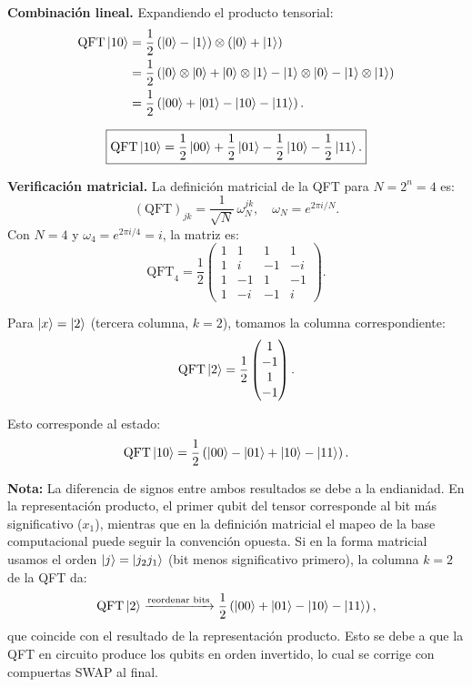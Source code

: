 \begin{enumerate}[a)]
	      \textbf{Combinación lineal.} Expandiendo el producto tensorial:
	      \begin{align*}
		      \text{QFT}\ket{10} & = \frac{1}{2}\left(\ket{0} - \ket{1}\right) \otimes \left(\ket{0} + \ket{1}\right)                                      \\
		                         & = \frac{1}{2}\left(\ket{0}\otimes\ket{0} + \ket{0}\otimes\ket{1} - \ket{1}\otimes\ket{0} - \ket{1}\otimes\ket{1}\right) \\
		                         & = \frac{1}{2}\left(\ket{00} + \ket{01} - \ket{10} - \ket{11}\right).
	      \end{align*}

	      \[
		      \boxed{\text{QFT}\ket{10} = \frac{1}{2}\ket{00} + \frac{1}{2}\ket{01} - \frac{1}{2}\ket{10} - \frac{1}{2}\ket{11}.}
	      \]

	      \textbf{Verificación matricial.} La definición matricial de la QFT para $N = 2^n = 4$ es:
	      \[
		      (\text{QFT})_{jk} = \frac{1}{\sqrt{N}} \, \omega_N^{jk}, \quad \omega_N = e^{2\pi i / N}.
	      \]
	      Con $N = 4$ y $\omega_4 = e^{2\pi i/4} = i$, la matriz es:
	      \[
		      \text{QFT}_4 = \frac{1}{2}
		      \begin{pmatrix}
			      1 & 1  & 1  & 1  \\
			      1 & i  & -1 & -i \\
			      1 & -1 & 1  & -1 \\
			      1 & -i & -1 & i
		      \end{pmatrix}.
	      \]

	      Para $\ket{x} = \ket{2}$ (tercera columna, $k = 2$), tomamos la columna correspondiente:
	      \[
		      \text{QFT}\ket{2} = \frac{1}{2}
		      \begin{pmatrix}
			      1 \\ -1 \\ 1 \\ -1
		      \end{pmatrix}.
	      \]

	      Esto corresponde al estado:
	      \[
		      \text{QFT}\ket{10} = \frac{1}{2}\left(\ket{00} - \ket{01} + \ket{10} - \ket{11}\right).
	      \]

	      \textbf{Nota:} La diferencia de signos entre ambos resultados se debe a la endianidad. En la representación producto, el primer qubit del tensor corresponde al bit más significativo ($x_1$), mientras que en la definición matricial el mapeo de la base computacional puede seguir la convención opuesta. Si en la forma matricial usamos el orden $\ket{j} = \ket{j_2 j_1}$ (bit menos significativo primero), la columna $k = 2$ de la QFT da:
	      \[
		      \text{QFT}\ket{2} \xrightarrow{\text{reordenar bits}} \frac{1}{2}\left(\ket{00} + \ket{01} - \ket{10} - \ket{11}\right),
	      \]
	      que coincide con el resultado de la representación producto. Esto se debe a que la QFT en circuito produce los qubits en orden invertido, lo cual se corrige con compuertas SWAP al final.

	      \vspace{1cm}

\end{enumerate}
